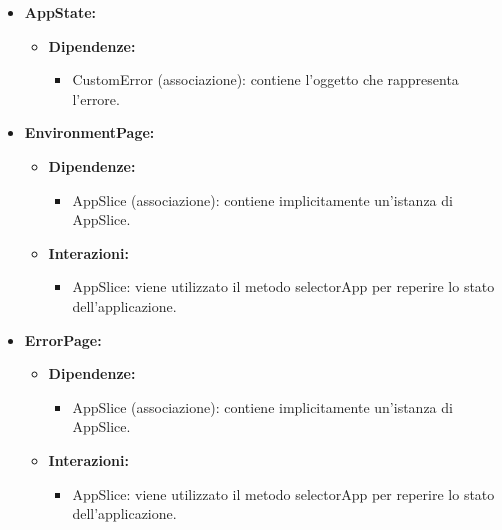 \begin{itemize}
      \item \textbf{AppState:}
            \begin{itemize}
                  \item \textbf{Dipendenze:}
                        \begin{itemize}
                              \item CustomError (associazione): contiene l'oggetto che rappresenta l'errore.
                        \end{itemize}
            \end{itemize}

      \item \textbf{EnvironmentPage:}
            \begin{itemize}
                  \item \textbf{Dipendenze:}
                        \begin{itemize}
                              \item AppSlice (associazione): contiene implicitamente un'istanza di AppSlice.
                        \end{itemize}
                  \item \textbf{Interazioni:}
                        \begin{itemize}
                              \item AppSlice: viene utilizzato il metodo selectorApp per reperire lo stato
                                    dell'applicazione.
                        \end{itemize}
            \end{itemize}

      \item \textbf{ErrorPage:}
            \begin{itemize}
                  \item \textbf{Dipendenze:}
                        \begin{itemize}
                              \item AppSlice (associazione): contiene implicitamente un'istanza di AppSlice.
                        \end{itemize}
                  \item \textbf{Interazioni:}
                        \begin{itemize}
                              \item AppSlice: viene utilizzato il metodo selectorApp per reperire lo stato
                                    dell'applicazione.
                        \end{itemize}
            \end{itemize}
\end{itemize}


